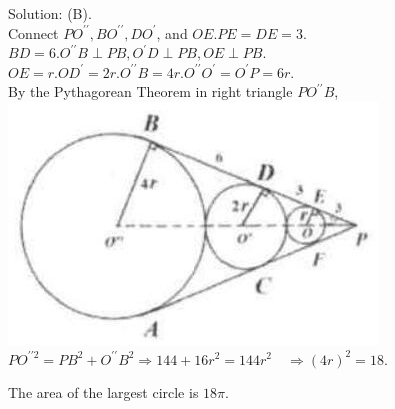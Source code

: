 \documentclass{article}
\begin{document}
Solution: (B).\\
Connect \(P O^{\prime \prime}, B O^{\prime \prime}, D O^{\prime}\), and \(O E . P E=D E=3\).\\
\(B D=6 . O^{\prime \prime} B \perp P B, O^{\prime} D \perp P B, O E \perp P B\).\\
\(O E=r . O D^{\prime}=2 r . O^{\prime \prime} B=4 r . O^{\prime \prime} O^{\prime}=O^{\prime} P=6 r\).\\
By the Pythagorean Theorem in right triangle \(P O^{\prime \prime} B\),\\
\centering
\includegraphics[width=\textwidth]{images/reasoning_image_1.jpg}\\
\(P O^{\prime \prime 2}=P B^{2}+O^{\prime \prime} B^{2} \Rightarrow 144+16 r^{2}=144 r^{2} \quad \Rightarrow(4 r)^{2}=18\).


The area of the largest circle is \(18 \pi\).\\
\end{document}
